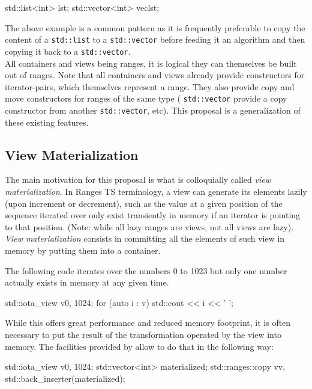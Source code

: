 \documentclass{wg21}
\newcommand{\cc}[1]{\texttt{#1}}
\begin{document}
\begin{codeblock}
    std::list<int> lst;
    std::vector<int> vec{lst};
\end{codeblock}


The above example is a common pattern as it is frequently preferable to copy the content of a \cc{std::list} to
a \cc{std::vector} before feeding it an algorithm and then copying it back to a \cc{std::vector}.\\

All containers and views being ranges, it is logical they can themselves be built out of ranges.
Note that all containers and views already provide constructors for iterator-pairs, which themselves represent a range.
They also provide copy and move constructors for ranges of the same type ( \cc{std::vector} provide a copy constructor from another \cc{std::vector}, etc).
This proposal is a generalization of these existing features.

\subsection{View Materialization}

The main motivation for this proposal is what is colloquially called \emph{view materialization}.
In Ranges TS terminology, a view can generate its elements lazily (upon increment or decrement), such as the value at a given position of the sequence
iterated over only exist transiently in memory if an iterator is pointing to that position.
(Note: while all lazy ranges are views, not all views are lazy).\\

\emph{View materialization} consists in committing all the elements of such view in memory by putting them into a container.

The following code iterates over the numbers 0 to 1023 but only one number actually exists in memory at any given time.
\begin{codeblock}
std::iota_view v{0, 1024};
for (auto i : v) {
    std::cout << i << ' ';
}
\end{codeblock}

While this offers great performance and reduced memory footprint, it is often necessary to put the result of the transformation operated by the view into memory.
The facilities provided by \cite{P0896R3} allow to do that in the following way:


\begin{codeblock}
    std::iota_view v{0, 1024};
    std::vector<int> materialized;
    std::ranges::copy v{v, std::back_inserter(materialized)};
\end{codeblock}
\end{document}
